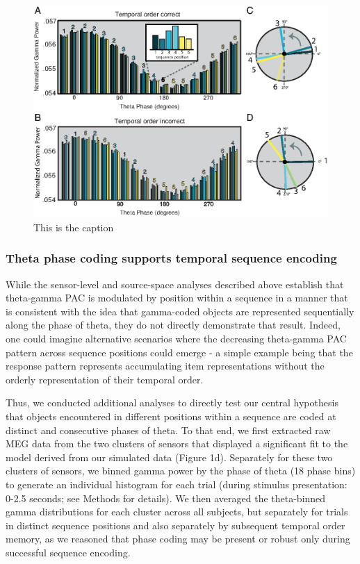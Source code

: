 \begin{figure}[htbp]
\centering
\includegraphics{figures/chapter3_figure2}
\caption{This is the caption}
\end{figure}

\subsubsection{Theta phase coding supports temporal sequence
encoding}\label{theta-phase-coding-supports-temporal-sequence-encoding}

While the sensor-level and source-space analyses described above
establish that theta-gamma PAC is modulated by position within a
sequence in a manner that is consistent with the idea that gamma-coded
objects are represented sequentially along the phase of theta, they do
not directly demonstrate that result. Indeed, one could imagine
alternative scenarios where the decreasing theta-gamma PAC pattern
across sequence positions could emerge - a simple example being that the
response pattern represents accumulating item representations without
the orderly representation of their temporal order.

Thus, we conducted additional analyses to directly test our central
hypothesis that objects encountered in different positions within a
sequence are coded at distinct and consecutive phases of theta. To that
end, we first extracted raw MEG data from the two clusters of sensors
that displayed a significant fit to the model derived from our simulated
data (Figure 1d). Separately for these two clusters of sensors, we
binned gamma power by the phase of theta (18 phase bins) to generate an
individual histogram for each trial (during stimulus presentation: 0-2.5
seconds; see Methods for details). We then averaged the theta-binned
gamma distributions for each cluster across all subjects, but separately
for trials in distinct sequence positions and also separately by
subsequent temporal order memory, as we reasoned that phase coding may
be present or robust only during successful sequence encoding.

